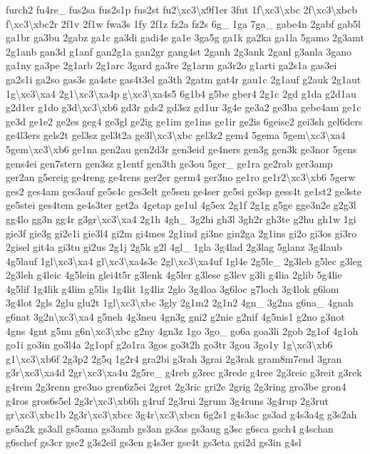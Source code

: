 \begin{DoxyCompactItemize}
furch2 fu4re\-\_\- fus2sa fus2s1p fus2st fu2\textbackslash{}xc3\textbackslash{}x9f1er 3fut 1f\textbackslash{}xc3\textbackslash{}xbc 2f\textbackslash{}xc3\textbackslash{}xbcb f\textbackslash{}xc3\textbackslash{}xbc2r 2f1v 2f1w fwa3s 1fy 2f1z fz2a fz2s 6g\-\_\- 1ga 7ga\-\_\- gabe4n 2gabf gab5l ga1br ga3bu 2gabz ga1c ga3di gadi4e ga1e 3ga5g ga1k ga2ka ga1la 5gamo 2g3amt 2g1anb gan3d g1anf gan2g1a gan2gr gang4st 2ganh 2g3ank 2ganl g3anla 3gano ga1ny ga3pe 2g1arb 2g1arc 3gard ga3re 2g1arm ga3r2o g1arti ga2s1a gas3ei ga2s1i ga2so gas3s ga4ste gas4t3el ga3th 2gatm gat4r gau1c 2g1auf g2auk 2g1aut 1g\textbackslash{}xc3\textbackslash{}xa4 2g1\textbackslash{}xc3\textbackslash{}xa4p g\textbackslash{}xc3\textbackslash{}xa4s5 6g1b4 g5be gber4 2g1c 2gd g1da g2d1au g2d1er g1do g3d\textbackslash{}xc3\textbackslash{}xb6 gd3r gds2 gd3sz gd1ur 3g4e ge3a2 ge3ba gebe4am ge1c ge3d ge1e2 ge2es geg4 ge3gl ge2ig ge1im ge1ins ge1ir ge2is 6geise2 gei3sh gel6ders ge4l3ers gels2t gel3sz gel3t2a ge3l\textbackslash{}xc3\textbackslash{}xbc gel3z2 gem4 5gema 5gem\textbackslash{}xc3\textbackslash{}xa4 5gem\textbackslash{}xc3\textbackslash{}xb6 ge1na gen2au gen2d3r gen3eid ge4ners gen3g gen3k ge3nor 5gens gens4ei gen7stern gen3sz g1entf gen3th ge3ou 5ger\-\_\- ge1ra ge2rab ger3amp ger2an g5ereig ge4reng ge4rens ger2er germ4 ger3no ge1ro ge1r2\textbackslash{}xc3\textbackslash{}xb6 5gerw ges2 ges4am ges3auf ge5s4c ges3elt ge5sen ge4ser ge5si ge3sp gess4t ge1st2 ge3ste ge5stei ges4tem ge4s3ter get2a 4getap ge1ul 4g5ex 2g1f 2g1g g5ge gge3n2e g2g3l gg4lo gg3n gg4r g3gr\textbackslash{}xc3\textbackslash{}xa4 2g1h 4gh\-\_\- 3g2hi gh3l 3gh2r gh3te g2hu gh1w 1gi gie3f gie3g gi2e1i gie3l4 gi2m gi4mes 2g1ind gi3ne gin2ga 2g1ins gi2o gi3os gi3ro 2gisel git4a gi3tu gi2us 2g1j 2g5k g2l 4gl\-\_\- 1gla 3g4lad 2g3lag 5glanz 3g4laub 4g5lauf 1gl\textbackslash{}xc3\textbackslash{}xa4 gl\textbackslash{}xc3\textbackslash{}xa4s3c 2gl\textbackslash{}xc3\textbackslash{}xa4uf 1gl4e 2g5le\-\_\- 2g3leb g5lec g3leg 2g3leh g4leic 4g5lein glei4t5r g3lenk 4g5ler g3lese g3lev g3li g4lia 2glib 5g4lie 4g5lif 1g4lik g4lim g5lis 1g4lit 1g4liz 2glo 3g4loa 3g6loc g7loch 3g4lok g6lom 3g4lot 2gls 2glu glu2t 1gl\textbackslash{}xc3\textbackslash{}xbc 3gly 2g1m2 2g1n2 4gn\-\_\- 3g2na g6na\-\_\- 4gnah g6nat 3g2n\textbackslash{}xc3\textbackslash{}xa4 g5neh 4g3neu 4gn3g gni2 g2nie g2nif 4g5nis1 g2no g3not 4gns 4gnt g5nu g6n\textbackslash{}xc3\textbackslash{}xbc g2ny 4gn3z 1go 3go\-\_\- go6a goa3li 2gob 2g1of 4g1oh go1i go3in go3l4a 2g1opf g2o1ra 3gos go3t2h go3tr 3gou 3go1y 1g\textbackslash{}xc3\textbackslash{}xb6 g1\textbackslash{}xc3\textbackslash{}xb6f 2g3p2 2g5q 1g2r4 gra2bi g3rah 3grai 2g3rak gram8m7end 3gran g3r\textbackslash{}xc3\textbackslash{}xa4d 2gr\textbackslash{}xc3\textbackslash{}xa4u 2g5re\-\_\- g4reb g3rec g3rede g4ree 2g3reic g3reit g3rek g4rem 2g3renn gre3no gren6z5ei 2gret 2g3ric gri2e 2grig 2g3ring gro3be gron4 g4ros gros6s5el 2g3r\textbackslash{}xc3\textbackslash{}xb6h g4ruf 2g3rui 2grum 3g4runs 3g4rup 2g3rut gr\textbackslash{}xc3\textbackslash{}xbc1b 2g3r\textbackslash{}xc3\textbackslash{}xbcc 3g4r\textbackslash{}xc3\textbackslash{}xbcn 6g2s1 g4s3ac gs3ad g4s3a4g g3s2ah gs5a2k gs3all gs5ama gs3amb gs3an gs3as gs3aug g3sc g6sca gsch4 g4schan g6schef gs3cr gse2 g3s2eil gs3en g4s3er gse4t gs3eta gsi2d gs3in g4sl 
\end{DoxyCompactItemize}
